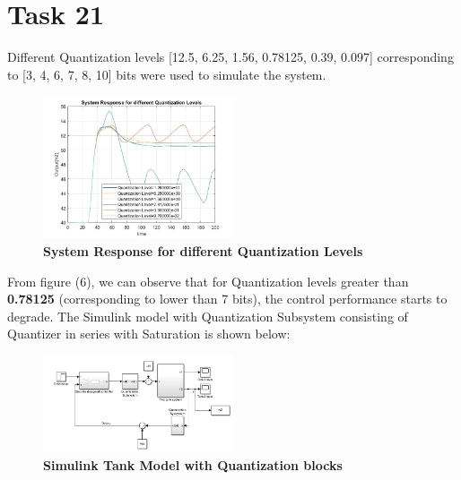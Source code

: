 \documentclass[a4paper,12pt,oneside,onecolumn]{article} %
\begin{document}
\section*{Task 21}
Different Quantization levels [12.5, 6.25, 1.56, 0.78125, 0.39, 0.097] corresponding to [3, 4, 6, 7, 8, 10] bits were used to simulate the system. 
 \begin{figure}[H]
\centering
  \includegraphics[width = 0.5\textwidth]{ex_21}
\caption{\textbf{System Response for different Quantization Levels }}
 \end{figure}

From figure (6), we can observe that for Quantization levels greater than \textbf{0.78125} (corresponding to lower than 7 bits), the control performance starts to degrade.
The Simulink model with Quantization Subsystem consisting of Quantizer in series with Saturation is shown below:
\begin{figure}[H]
\centering
  \includegraphics[width = 0.5\textwidth]{simModel}
\caption{\textbf{Simulink Tank Model with Quantization blocks }}
 \end{figure}
\end{document}
